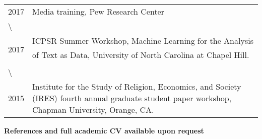 \documentclass[]{article}
\begin{document}
\begin{tabular}{>{}l|>{\raggedright\arraybackslash}p{50em}}
\hline
 & \\
\hline
2017 & Media training, Pew Research Center\\
\hline
\textbackslash{} & \\
\hline
2017 & ICPSR Summer Workshop, Machine Learning for the Analysis of Text as Data, University of North Carolina at Chapel Hill.\\
\hline
\textbackslash{} & \\
\hline
2015 & Institute for the Study of Religion, Economics, and Society (IRES) fourth annual graduate student paper workshop, Chapman University, Orange, CA.\\
\hline
\end{tabular}

\textbf{References and full academic CV available upon request}
\end{document}
